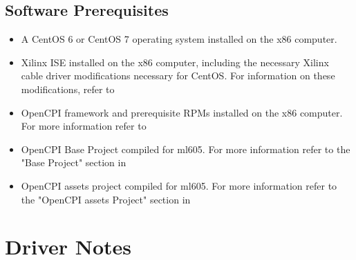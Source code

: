 \documentclass{article}
\begin{document}
\subsection*{Software Prerequisites}
\begin{itemize}
\item A CentOS 6 or CentOS 7 operating system installed on the x86 computer.
\item Xilinx ISE installed on the x86 computer, including the necessary Xilinx cable driver modifications necessary for CentOS. For information on these modifications, refer to \cite{fpga_vendor_tool_guide}
\item OpenCPI framework and prerequisite RPMs installed on the x86 computer. For more information refer to \cite{rpm_installation_guide}
\item OpenCPI Base Project compiled for ml605. For more information refer to the "Base Project" section in \cite{rpm_installation_guide}
\item OpenCPI assets project compiled for ml605. For more information refer to the "OpenCPI assets Project" section in \cite{rpm_installation_guide}
\end{itemize}



\section*{Driver Notes}
 
\end{document}
